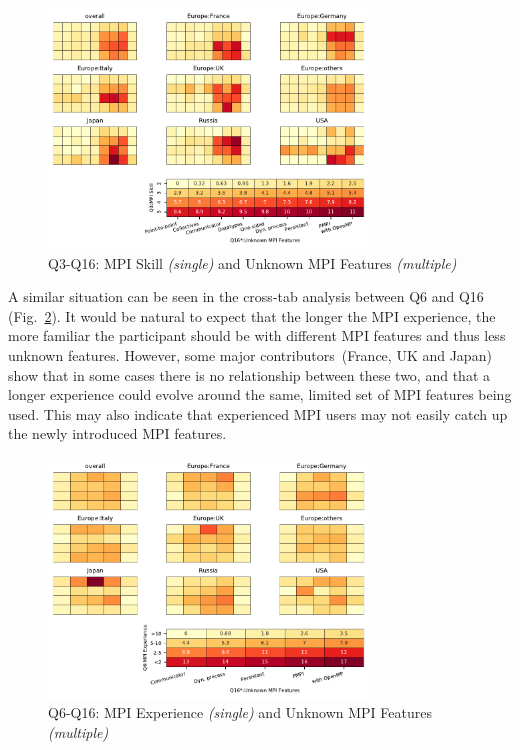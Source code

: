 \documentclass[preprint,5p,times]{elsarticle}
\def\mcountries{major contributors\xspace{}}%
\begin{document}
\begin{figure}[htb]
  \begin{center}
    \includegraphics[width=8.5cm]{Figs/Q3-Q16.pdf}
    \caption{Q3-Q16: MPI Skill {\it(single)} and Unknown MPI Features {\it(multiple)}}
    \label{fig:skill-and-aspects}
  \end{center}
\end{figure}

A similar situation can be seen in the cross-tab analysis between Q6 and Q16
(Fig.~\ref{fig:experience-and-aspects}). It would be natural to expect that the
longer the MPI experience, the more familiar the participant should be with
different MPI features and thus less unknown features. However, some
\mcountries\ (France, UK and Japan) show that in some cases there is no
relationship between these two, and that a longer experience could evolve around
the same, limited set of MPI features being used.  This may also indicate that
experienced MPI users may not easily catch up the newly introduced MPI features.

\begin{figure}[htb]
  \begin{center}
    \includegraphics[width=8.5cm]{Figs/Q6-Q16.pdf}
    \caption{Q6-Q16: MPI Experience {\it(single)} and Unknown MPI Features {\it(multiple)}}
    \label{fig:experience-and-aspects}
  \end{center}
\end{figure}
\end{document}
